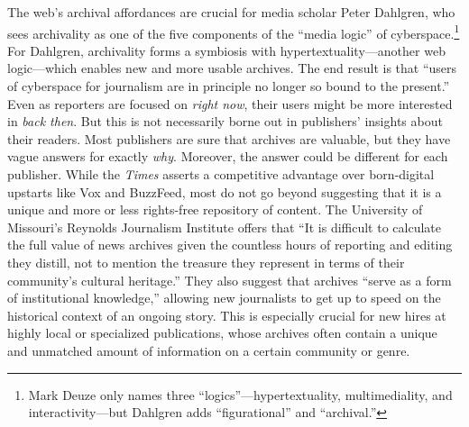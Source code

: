 The web's archival affordances are crucial for media scholar Peter Dahlgren, who sees archivality as one of the five components of the ``media logic'' of cyberspace.\footnote{Mark Deuze only names three ``logics''---hypertextuality, multimediality, and interactivity---but Dahlgren adds ``figurational'' and ``archival.''} For Dahlgren, archivality forms a symbiosis with hypertextuality---another web logic---which enables new and more usable archives. The end result is that ``users of cyberspace for journalism are in principle no longer so bound to the present.''\autocite[66]{dahlgren_media_1996} Even as reporters are focused on \emph{right now}, their users might be more interested in \emph{back then}. But this is not necessarily borne out in publishers' insights about their readers. Most publishers are sure that archives are valuable, but they have vague answers for exactly \emph{why}. Moreover, the answer could be different for each publisher. While the \emph{Times} asserts a competitive advantage over born-digital upstarts like Vox and BuzzFeed, most do not go beyond suggesting that it is a unique and more or less rights-free repository of content. The University of Missouri's Reynolds Journalism Institute offers that ``It is difficult to calculate the full value of news archives given the countless hours of reporting and editing they distill, not to mention the treasure they represent in terms of their community's cultural heritage.''\autocite{mccain_saving_2014} They also suggest that archives ``serve as a form of institutional knowledge,'' allowing new journalists to get up to speed on the historical context of an ongoing story. This is especially crucial for new hires at highly local or specialized publications, whose archives often contain a unique and unmatched amount of information on a certain community or genre.



